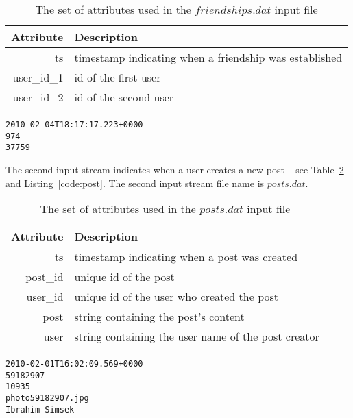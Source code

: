 \documentclass{sig-alternate}
\begin{document}
\begin{table}[ht]
	\caption{The set of attributes used in the $friendships.dat$ input file}
	\centering 
	\begin{tabular}{r p{5.2cm}}
		\toprule
		Attribute		&	 Description\\
		\midrule
		ts			&	timestamp indicating when a friendship was established\\[2ex]
		user\_id\_1	&	id of the first user\\[2ex]
		user\_id\_2	&	id of the second user\\[2ex]		
		\bottomrule 
	\end{tabular}
	\label{table:friend}
\end{table}



\lstset{}
\begin{lstlisting}[float=ht,caption={First line from the $friendships.dat$ file -- one attribute per line of listing},label={code:friend}]
2010-02-04T18:17:17.223+0000
974
37759
\end{lstlisting}	

The second input stream indicates when a user creates a new post -- see Table~\ref{table:post} and Listing~\ref{code:post}. The second input stream file name is $posts.dat$.

\begin{table}[ht]
	\caption{The set of attributes used in the $posts.dat$ input file}
	\centering 
	\begin{tabular}{r p{5.2cm}}
		\toprule
		Attribute		&	 Description\\
		\midrule
		ts			&	timestamp indicating when a post was created\\[2ex]
		post\_id	&	unique id of the post\\[2ex]
		user\_id	&	unique id of the user who created the post\\[2ex]		
		post		& 	string containing the post's content\\[2ex]		
		user		&   string containing the user name of the post creator\\[2ex]
		\bottomrule 
	\end{tabular}
	\label{table:post}
\end{table}

\lstset{}
\begin{lstlisting}[float=ht,caption={First line from the $posts.dat$ file -- one attribute per line of listing},label={code:post}]
2010-02-01T16:02:09.569+0000
59182907
10935
photo59182907.jpg
Ibrahim Simsek
\end{lstlisting}
\end{document}
